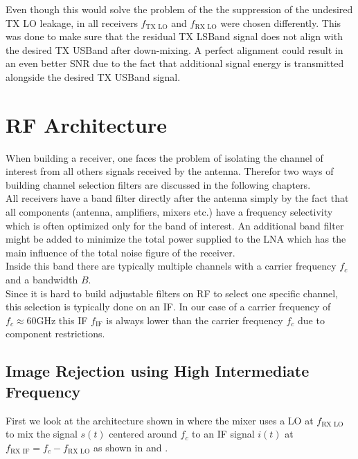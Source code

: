 Even though this would solve the problem of the the suppression of the
undesired \gls{TX} \gls{LO} leakage, in all receivers
$f_{\text{TX LO}}$ and $f_{\text{RX LO}}$ were chosen differently.
This was done to make sure that the residual \gls{TX} \gls{LSBand}
signal does not align with the desired \gls{TX} \gls{USBand} after
down-mixing. A perfect alignment could result in an even better
\gls{SNR} due to the fact that additional signal energy is transmitted
alongside the desired \gls{TX} \gls{USBand} signal. \\

\section{RF Architecture}
When building a receiver, one faces the problem of isolating the channel of
interest from all others signals received by the antenna. Therefor
two ways of building channel selection filters are discussed in the following
chapters. \\

All receivers have a band filter directly after the antenna simply by the
fact that all components (antenna, amplifiers, mixers etc.) have a frequency
selectivity which is often optimized only for the band of interest.
An additional band filter might be added to minimize the total power supplied
to the \gls{LNA} which has the main influence of the total noise figure of
the receiver. \\

Inside this band there are typically multiple channels with a carrier frequency
$f_c$ and a bandwidth $B$. \\

Since it is hard to build adjustable filters on \gls{RF} to select one specific
channel, this selection is typically done on an \gls{IF}. In our case of a
carrier frequency of $f_c \approx 60 \text{GHz}$ this \gls{IF} $f_{\text{IF}}$
is always lower than the carrier frequency $f_c$ due to component restrictions. \\

\subsection{Image Rejection using High Intermediate Frequency}
\label{sec:rx_rf_0}
First we look at the architecture shown in  where
the mixer uses a \gls{LO} at $f_{\text{RX LO}}$ to mix the signal $s(t)$
centered around $f_{c}$ to an \gls{IF} signal $i(t)$ at
$f_{\text{RX IF}} = f_{c} - f_{\text{RX LO}}$ as shown in 
and . \\

